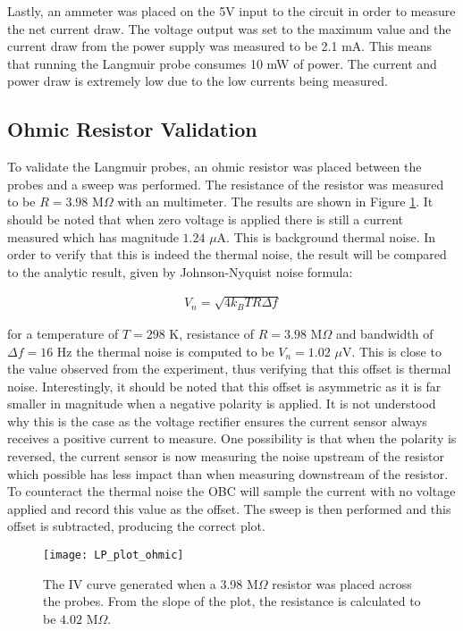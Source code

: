 Lastly, an ammeter was placed on the 5V input to the circuit in order to measure the net current draw. The voltage output was set to the maximum value and the current draw from the power supply was measured to be 2.1 mA. This means that running the Langmuir probe consumes 10 mW of power. The current and power draw is extremely low due to the low currents being measured.

\subsection{Ohmic Resistor Validation}
To validate the Langmuir probes, an ohmic resistor was placed between the probes and a sweep was performed. The resistance of the resistor was measured to be $R=3.98$ M$\Omega$ with an multimeter. The results are shown in Figure \ref{fig:LP_plot_ohmic}. It should be noted that when zero voltage is applied there is still a current measured which has magnitude $1.24$ $\mu$A. This is background thermal noise. In order to verify that this is indeed the thermal noise, the result will be compared to the analytic result, given by Johnson-Nyquist noise formula:

\begin{align*}
	V_n = \sqrt{4k_B TR \Delta f}
\end{align*}

for a temperature of $T=298$ K, resistance of $R=3.98$ M$\Omega$ and bandwidth of $\Delta f =16$ Hz the thermal noise is computed to be $V_n =1.02$ $\mu$V. This is close to the value observed from the experiment, thus verifying that this offset is thermal noise. Interestingly, it should be noted that this offset is asymmetric as it is far smaller in magnitude when a negative polarity is applied. It is not understood why this is the case as the voltage rectifier ensures the current sensor always receives a positive current to measure. One possibility is that when the polarity is reversed, the current sensor is now measuring the noise upstream of the resistor which possible has less impact than when measuring downstream of the resistor. To counteract the thermal noise the OBC will sample the current with no voltage applied and record this value as the offset. The sweep is then performed and this offset is subtracted, producing the correct plot.\\

\begin{figure}[h]
	\centering
	\texttt{[image: LP\_plot\_ohmic]}
	\caption{The IV curve generated when a 3.98 M$\Omega$ resistor was placed across the probes. From the slope of the plot, the resistance is calculated to be $4.02$ M$\Omega$.}
	\label{fig:LP_plot_ohmic}
\end{figure}

